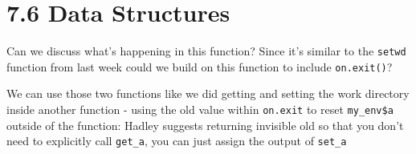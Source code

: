 \documentclass[]{book}
\newenvironment{Shaded}{\begin{snugshade}}{\end{snugshade}}
\newcommand{\CommentTok}[1]{\textcolor[rgb]{0.56,0.35,0.01}{\textit{#1}}}
\newcommand{\ControlFlowTok}[1]{\textcolor[rgb]{0.13,0.29,0.53}{\textbf{#1}}}
\newcommand{\DataTypeTok}[1]{\textcolor[rgb]{0.13,0.29,0.53}{#1}}
\newcommand{\DecValTok}[1]{\textcolor[rgb]{0.00,0.00,0.81}{#1}}
\newcommand{\KeywordTok}[1]{\textcolor[rgb]{0.13,0.29,0.53}{\textbf{#1}}}
\newcommand{\NormalTok}[1]{#1}
\newcommand{\OperatorTok}[1]{\textcolor[rgb]{0.81,0.36,0.00}{\textbf{#1}}}
\newcommand{\OtherTok}[1]{\textcolor[rgb]{0.56,0.35,0.01}{#1}}
\newcommand{\StringTok}[1]{\textcolor[rgb]{0.31,0.60,0.02}{#1}}
\begin{document}
\hypertarget{data-structures}{%
\section*{7.6 Data Structures}\label{data-structures}}

Can we discuss what's happening in this function? Since it's similar to the \texttt{setwd} function from last week could we build on this function to include \texttt{on.exit()}?

\begin{Shaded}
\end{Shaded}

We can use those two functions like we did getting and setting the work directory inside another function - using the old value within \texttt{on.exit} to reset \texttt{my\_env\$a} outside of the function: Hadley suggests returning invisible old so that you don't need to explicitly call \texttt{get\_a}, you can just assign the output of \texttt{set\_a}

\begin{Shaded}
\end{Shaded}
\end{document}
